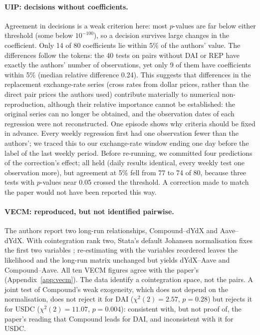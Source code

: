 \documentclass[11pt]{article}
\begin{document}
\paragraph{UIP: decisions without coefficients.} Agreement in decisions is a weak criterion here: most $p$-values are far below either threshold (some below $10^{-100}$), so a decision survives large changes in the coefficient. Only 14 of 80 coefficients lie within 5\% of the authors' value. The differences follow the tokens: the 40 tests on pairs without DAI or REP have exactly the authors' number of observations, yet only 9 of them have coefficients within 5\% (median relative difference 0.24). This suggests that differences in the replacement exchange-rate series (cross rates from dollar prices, rather than the direct pair prices the authors used) contribute materially to numerical non-reproduction, although their relative importance cannot be established: the original series can no longer be obtained, and the observation dates of each regression were not reconstructed. One episode shows why criteria should be fixed in advance. Every weekly regression first had one observation fewer than the authors'; we traced this to our exchange-rate window ending one day before the label of the last weekly period. Before re-running, we committed four predictions of the correction's effect; all held (daily results identical, every weekly test one observation more), but agreement at 5\% fell from 77 to 74 of 80, because three tests with $p$-values near 0.05 crossed the threshold. A correction made to match the paper would not have been reported this way.

\paragraph{VECM: reproduced, but not identified pairwise.} The authors report two long-run relationships, Compound--dYdX and Aave--dYdX. With cointegration rank two, Stata's default Johansen normalisation fixes the first two variables \citep{johansen1991estimation}; re-estimating with the variables reordered leaves the likelihood and the long-run matrix unchanged but yields dYdX--Aave and Compound--Aave. All ten VECM figures agree with the paper's (Appendix~\ref{app:vecm}). The data identify a cointegration space, not the pairs. A joint test of Compound's weak exogeneity, which does not depend on the normalisation, does not reject it for DAI ($\chi^2(2)=2.57$, $p=0.28$) but rejects it for USDC ($\chi^2(2)=11.07$, $p=0.004$): consistent with, but not proof of, the paper's reading that Compound leads for DAI, and inconsistent with it for USDC.
\end{document}
